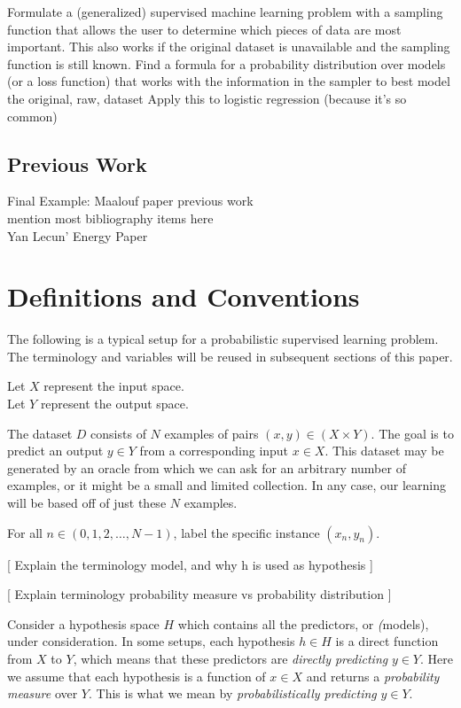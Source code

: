 \documentclass[twoside]{article}
\begin{document}
Formulate a (generalized) supervised machine learning problem with a sampling function that allows the user to determine which pieces of data are most important.
This also works if the original dataset is unavailable and the sampling function is still known.
Find a formula for a probability distribution over models (or a loss function) that works with the information in the sampler to best model the original, raw, dataset
Apply this to logistic regression (because it’s so common)





\subsection{Previous Work}

Final Example: Maalouf paper
previous work \\
mention most bibliography items here \\
Yan Lecun' Energy Paper \\


\section{Definitions and Conventions}

The following is a typical setup for a probabilistic supervised learning problem. The terminology and variables will be reused in subsequent sections of this paper.

Let \(X\) represent the input space. \\
Let \(Y\) represent the output space.

The dataset \(D\) consists of \(N\) examples of pairs \((x, y) \in (X \times Y) \). The goal is to predict an output \(y \in Y\) from a corresponding input \(x \in X\). This dataset may be generated by an oracle from which we can ask for an arbitrary number of examples, or it might be a small and limited collection. In any case, our learning will be based off of just these \(N\) examples.

For all \(n \in (0, 1, 2,\ldots,N-1)\), label the specific instance \((x_n, y_n)\).

[ Explain the terminology model, and why h is used as hypothesis ]

[ Explain terminology probability measure vs probability distribution ]

Consider a hypothesis space \(H\) which contains all the predictors, or \textit(models), under consideration. In some setups, each hypothesis \(h \in H\) is a direct function from \(X\) to \(Y\), which means that these predictors are \textit{directly predicting} \(y \in Y\). Here we assume that each hypothesis is a function of \(x \in X\) and returns a \textit{probability measure} over \(Y\). This is what we mean by \textit{probabilistically predicting} \(y \in Y\).
\end{document}
